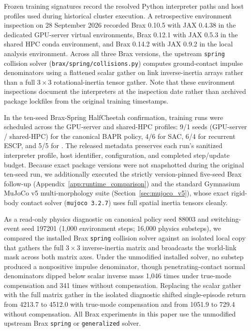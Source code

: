 Frozen training signatures record the resolved Python interpreter paths and host profiles used during historical cluster execution. A retrospective environment inspection on 28 September 2026 recorded Brax 0.10.5 with JAX 0.4.38 in the dedicated GPU-server virtual environments, Brax 0.12.1 with JAX 0.5.3 in the shared HPC conda environment, and Brax 0.14.2 with JAX 0.9.2 in the local analysis environment. Across all three Brax versions, the upstream \texttt{spring} collision solver (\texttt{brax/spring/collisions.py}) computes ground-contact impulse denominators using a flattened scalar gather on link inverse-inertia arrays rather than a full $3\times 3$ rotational-inertia tensor gather. Note that these environment inspections document the interpreters at the inspection date rather than archived package lockfiles from the original training timestamps.

In the ten-seed Brax-Spring HalfCheetah confirmation, training runs were scheduled across the GPU-server and shared-HPC profiles: 9/1 seeds (GPU-server / shared-HPC) for the canonical BAPR policy, 4/6 for SAC, 6/4 for recurrent ESCP, and 5/5 for \resacbaseline{}. The released metadata preserves each run's sanitized interpreter profile, host identifier, configuration, and completed step/update budget. Because exact package versions were not snapshotted during the original ten-seed run, we additionally executed the strictly version-pinned five-seed Brax follow-up (Appendix~\ref{app:runtime_comparison}) and the standard Gymnasium MuJoCo v5 multi-morphology suite (Section~\ref{sec:mujoco_v5}), whose exact rigid-body contact solver (\texttt{mujoco 3.2.7}) uses full spatial inertia tensors cleanly.

As a read-only physics diagnostic on canonical policy seed 88003 and switching-event seed 197201 (1,000 environment steps; 16,000 physics substeps), we compared the installed Brax \texttt{spring} collision solver against an isolated local copy that gathers the full $3\times 3$ inverse-inertia matrix and broadcasts the world-link mask across both matrix axes. Under the unmodified installed solver, no substep produced a nonpositive impulse denominator, though penetrating-contact normal denominators dipped below scalar inverse mass 1,046 times under true-mode compensation and 341 times without compensation. Replacing the scalar gather with the full matrix gather in the isolated diagnostic shifted single-episode return from 4213.7 to 4512.0 with true-mode compensation and from 1051.9 to 729.4 without compensation. All Brax experiments in this paper use the unmodified upstream Brax \texttt{spring} or \texttt{generalized} solver.

